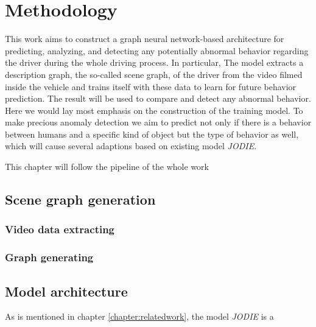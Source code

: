 \chapter{Methodology}\label{chapter:methodology}

This work aims to construct a graph neural network-based architecture for predicting, analyzing, and detecting any potentially abnormal behavior regarding the driver during the whole driving process. In particular, The model extracts a description graph, the so-called scene graph, of the driver from the video filmed inside the vehicle and trains itself with these data to learn for future behavior prediction. The result will be used to compare and detect any abnormal behavior. Here we would lay most emphasis on the construction of the training model. To make precious anomaly detection we aim to predict not only if there is a behavior between humans and a specific kind of object but the type of behavior as well, which will cause several adaptions based on existing model \textit{JODIE}.

This chapter will follow the pipeline of the whole work






\section{Scene graph generation}


    \subsection{Video data extracting}

    \subsection{Graph generating}

\section{Model architecture}
As is mentioned in chapter \ref{chapter:relatedwork}, the model \textit{JODIE} is a 





